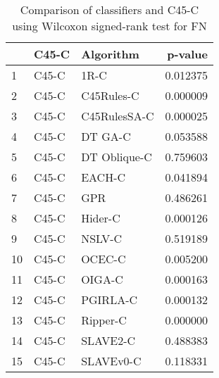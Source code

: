 \begin{table}
\footnotesize
\caption{Comparison of classifiers and C45-C using Wilcoxon signed-rank test for FN}
\label{tab:C45-C wilcoxon FN comparison}
\begin{tabular}{lllr}
\hline
 & C45-C & Algorithm & p-value \\
\hline
1 & C45-C & 1R-C & 0.012375 \\
2 & C45-C & C45Rules-C & 0.000009 \\
3 & C45-C & C45RulesSA-C & 0.000025 \\
4 & C45-C & DT GA-C & 0.053588 \\
5 & C45-C & DT Oblique-C & 0.759603 \\
6 & C45-C & EACH-C & 0.041894 \\
7 & C45-C & GPR & 0.486261 \\
8 & C45-C & Hider-C & 0.000126 \\
9 & C45-C & NSLV-C & 0.519189 \\
10 & C45-C & OCEC-C & 0.005200 \\
11 & C45-C & OIGA-C & 0.000163 \\
12 & C45-C & PGIRLA-C & 0.000132 \\
13 & C45-C & Ripper-C & 0.000000 \\
14 & C45-C & SLAVE2-C & 0.488383 \\
15 & C45-C & SLAVEv0-C & 0.118331 \\
\hline
\end{tabular}
\end{table}
